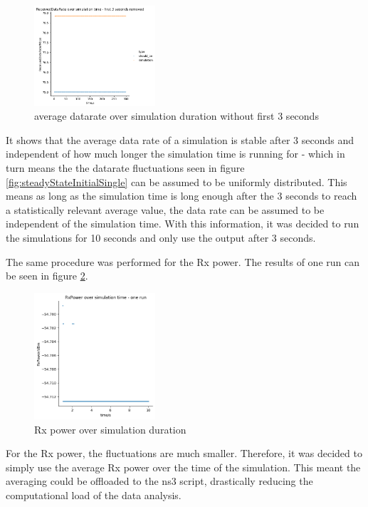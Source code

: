 \begin{figure}[ht]
    \centering
    \includegraphics[width=0.4\textwidth]{../DataAnalysis/results/dr_over_time_without_first_3_seconds.png}
    \caption{average datarate over simulation duration without first 3 seconds}
    \label{fig:steadyStateFinal}
\end{figure}

It shows that the average data rate of a simulation is stable after 3 seconds and independent of how much longer the simulation 
time is running for - which in turn means the the datarate fluctuations seen in figure \ref{fig:steadyStateInitialSingle} can be assumed to be 
uniformly distributed. This means as long as the simulation time is long enough after the 3 seconds to reach a statistically relevant 
average value, the data rate can be assumed to be independent of the simulation time. With this information, it was 
decided to run the simulations for 10 seconds and only use the output after 3 seconds.

The same procedure was performed for the Rx power. The results of one run can be seen in figure \ref{fig:rxPowerSteadyState}.
\begin{figure}[ht]
    \centering
    \includegraphics[width=0.4\textwidth]{../DataAnalysis/results/results_rx_pwr_over_time.png}
    \caption{Rx power over simulation duration}
    \label{fig:rxPowerSteadyState}
\end{figure}

For the Rx power, the fluctuations are much smaller. Therefore, it was decided to simply use the average Rx power over the
time of the simulation. This meant the averaging could be offloaded to the ns3 script, drastically 
reducing the computational load of the data analysis.


